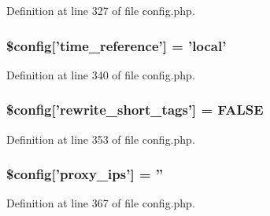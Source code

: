 Definition at line 327 of file config.\-php.

\hypertarget{application_2config_2config_8php_acb20698e35bc3d4b9692a4b4619b1b05}{
\subsubsection[{\$config}]{\setlength{\rightskip}{0pt plus 5cm}\$config\mbox{[}'time\-\_\-reference'\mbox{]} = 'local'}}\label{application_2config_2config_8php_acb20698e35bc3d4b9692a4b4619b1b05}


Definition at line 340 of file config.\-php.

\hypertarget{application_2config_2config_8php_a5d2e2b3f3030d1bd97f6d986ef13ace9}{
\subsubsection[{\$config}]{\setlength{\rightskip}{0pt plus 5cm}\$config\mbox{[}'rewrite\-\_\-short\-\_\-tags'\mbox{]} = F\-A\-L\-S\-E}}\label{application_2config_2config_8php_a5d2e2b3f3030d1bd97f6d986ef13ace9}


Definition at line 353 of file config.\-php.

\hypertarget{application_2config_2config_8php_a99ce814cf767ce4e281380e6f2158b1b}{
\subsubsection[{\$config}]{\setlength{\rightskip}{0pt plus 5cm}\$config\mbox{[}'proxy\-\_\-ips'\mbox{]} = ''}}\label{application_2config_2config_8php_a99ce814cf767ce4e281380e6f2158b1b}


Definition at line 367 of file config.\-php.

